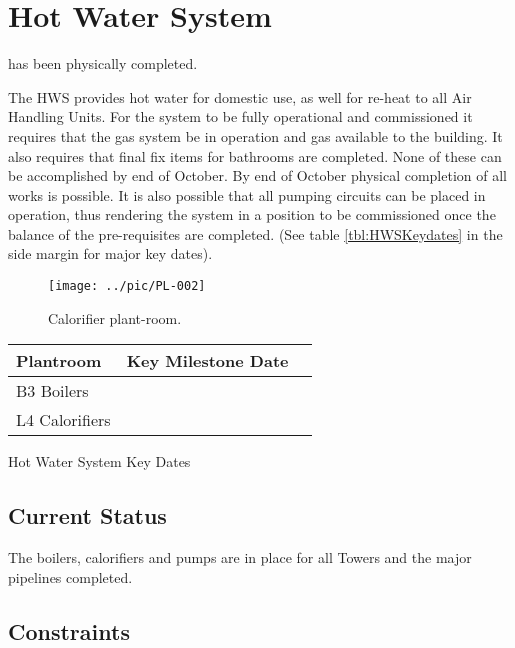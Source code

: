 \chapter{Hot Water System  }


 has been physically completed.

The HWS provides hot water for domestic use, as well for re-heat to all Air Handling Units. For the system to be fully operational and commissioned it requires that the gas system  be in operation and gas available to the building. It also requires that final fix items for bathrooms are completed. None of these can be accomplished by end of October. By end of October physical completion of all works is possible. It is also possible that all pumping circuits can be placed in operation, thus rendering the system in a position to be commissioned once the balance of the pre-requisites are completed. (See table \ref{tbl:HWSKeydates} in the side margin for major key dates).

\begin{figure*}
  \texttt{[image: ../pic/PL-002]}
  \caption{Calorifier plant-room.}
  \label{fig:MWcalorifiers}
\end{figure*}

           \begin{margintable} 
	    \begin{tabular}{lcl}
	      \toprule
	      Plantroom    & Key Milestone Date  \\
	      \midrule
	      B3 Boilers             &   \\
	      L4 Calorifiers       &   \\
	      \bottomrule
	    \end{tabular}
           \caption{Hot Water System Key Dates}
           \label{tbl:HWSKeydates}
            \end{margintable}
 

\section{Current Status}

The boilers, calorifiers and pumps are in place for all Towers and the major pipelines completed. 

\section{Constraints}

